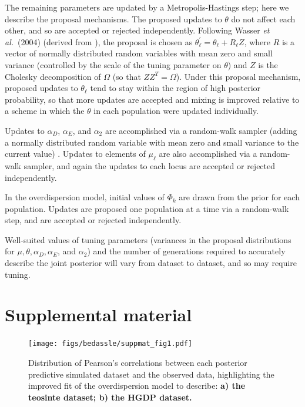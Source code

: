 The remaining parameters are updated by a Metropolis-Hastings step;
here we describe the proposal mechanisms.
The proposed updates to $\theta$ do not affect each other, and so are accepted or rejected independently.  Following Wasser \textit{et al.}~(2004) (derived from \citep{ChristensenWaagepetersen2002, Moller1998}), the proposal is chosen as $\theta_{\ell}^{'} = \theta_{\ell} +  R_{\ell}Z$, where $R$ is a vector of normally distributed random variables with mean zero and small variance (controlled by the scale of the tuning parameter on $\theta$) and $Z$ is the Cholesky decomposition of $\Omega$ (so that $ZZ^{T} = \Omega$).  Under this proposal mechanism, proposed updates to $\theta_{\ell}$ tend to stay within the region of high posterior probability, so that more updates are accepted and mixing is improved relative to a scheme in which the $\theta$ in each population were updated individually.  

Updates to $\alpha_{D}$, $\alpha_{E}$, and $\alpha_{2}$ are accomplished via a random-walk sampler (adding a normally distributed random variable with mean zero and small variance to the current value) \citep{Gilks1996}.  Updates to elements of $\mu_{\ell}$ are also accomplished via a random-walk sampler, and again the updates to each locus are accepted or rejected independently.  

In the overdispersion model, initial values of $\Phi_{k}$ are drawn from the prior for each population.  Updates are proposed one population at a time via a random-walk step, and are accepted or rejected independently.  

Well-suited values of tuning parameters (variances in the proposal distributions for $\mu,\theta,\alpha_{D},\alpha_{E}$, and $\alpha_{2}$)
and the number of generations required to accurately describe the joint posterior will vary from dataset to dataset, and so may require tuning.

%



\clearpage

\section*{Supplemental material}
\renewcommand{\thefigure}{S1.\arabic{figure}}
\setcounter{figure}{0}
\renewcommand{\thetable}{S1.\arabic{table}}
\setcounter{table}{0}

\begin{figure}[ht!]
\begin{center}
  \texttt{[image: figs/bedassle/suppmat\_fig1.pdf]}
 \caption{
 		\textmd{Distribution of Pearson's correlations between each posterior predictive simulated dataset and the observed data, highlighting the improved fit of the overdispersion model to describe:}
	\bf{a)}
 		\textmd{the teosinte dataset;}
	\bf{b)}
 		\textmd{the HGDP dataset.}
 \label{sfig:pps.corr}
  }
\end{center}
\end{figure}

